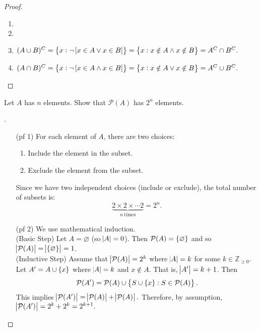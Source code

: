 \documentclass[11pt,openany]{article}
\begin{document}
\begin{proof}
	\begin{enumerate}[(1)]
		\item 
		\item 
		\item \textcolor{gray!50!white}{$(A\cup B)^C=\set{x:\lnot\left[x\in A\lor x\in B\right]}=\set{x:x\notin A\land x\notin B}=A^C\cap B^C.$}
		\item \textcolor{gray!50!white}{$(A\cap B)^C=\set{x:\lnot\left[x\in A\land x\in B\right]}=\set{x:x\notin A\lor x\notin B}=A^C\cup B^C.$}
	\end{enumerate}
\end{proof}

\vfill
\begin{exercise*}
	Let $A$ has $n$ elements. Show that $\mathcal{P}(A)$ has $2^n$ elements.
	\begin{proof}[\sol] 
		\textcolor{gray!50!white}{\begin{itemize}
			\item[(pf 1)] For each element of $A$, there are two choices:
			\begin{enumerate}
				\item Include the element in the subset.
				\item Exclude the element from the subset.
			\end{enumerate}
			Since we have two independent choices (include or exclude), the total number of subsets is:
			\[
			\underbrace{2\times 2\times\cdots 2}_{n\ \text{times}}=2^n.
			\]
			\item[(pf 2)] We use mathematical induction.
			\ \\
			(Basic Step) Let $A=\varnothing$ (so $\abs{A}=0$). Then $\mathcal{P}(A)=\set{\varnothing}$ and so $\abs{\mathcal{P}(A)}=\abs{\set{\varnothing}}=1$.
			\ \\
			(Inductive Step) Assume that $\abs{\mathcal{P}(A)}=2^k$ where $\abs{A}=k$ for some $k\in\mathbb{Z}_{\geq  0}$. Let $A'=A\cup\set{x}$ where $\abs{A}=k$ and $x\notin A$. That is, $\abs{A'}=k+1$. Then \[
			\mathcal{P}(A')=\mathcal{P}(A)\cup\set{S\cup \set{x}:S\in \mathcal{P}(A)}.
			\] This implies $\abs{\mathcal{P}(A')}=\abs{\mathcal{P}(A)} + \abs{\mathcal{P}(A)}.$ Therefore, by assumption, $\abs{\mathcal{P}(A')}=2^k + 2^k=2^{k+1}.$
		\end{itemize}}
	\end{proof}
\end{exercise*}
\end{document}
